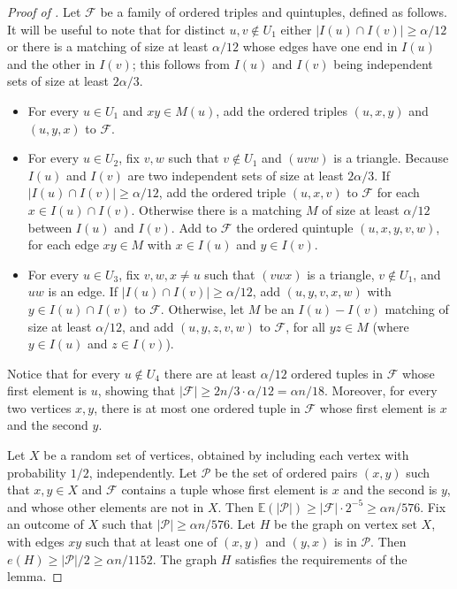 \documentclass[10pt,a4paper]{amsart}
\newcommand{\Ex}{\mathbb{E}}
\newcommand{\cF}{\mathcal{F}}
\newcommand{\cP}{\mathcal{P}}
\begin{document}
\begin{proof}[Proof of ]
			Let $\cF$ be a family of ordered triples and quintuples, defined as follows. 
			It will be useful to note that for distinct $u,v \notin U_1$ either $|I(u) \cap I(v)| \ge \alpha/12$ or there is a matching of size at least $\alpha/12$ whose edges have one end in $I(u)$ and the other in $I(v)$; this follows from $I(u)$ and $I(v)$ being independent sets of size at least $2\alpha/3$.
			\begin{itemize}
				\item
					For every $u \in U_1$ and $xy \in M(u)$, add the ordered triples $(u,x,y)$ and $(u, y, x)$ to $\cF$.
				\item
					For every $u \in U_2$, fix $v, w$ such that $v \notin U_1$ and $(uvw)$ is a triangle.
					Because $I(u)$ and $I(v)$ are two independent sets of size at least $2\alpha/3$.
					If $|I(u) \cap I(v)| \ge \alpha/12$, add the ordered triple $(u,x,v)$ to $\cF$ for each $x \in I(u) \cap I(v)$. 
					Otherwise there is a matching $M$ of size at least $\alpha/12$ between $I(u)$ and $I(v)$. Add to $\cF$ the ordered quintuple $(u, x, y, v, w)$, for each edge $xy \in M$ with $x \in I(u)$ and $y \in I(v)$.
				\item
					For every $u \in U_3$, fix $v, w, x \neq u$ such that $(v w x)$ is a triangle, $v \notin U_1$, and $uw$ is an edge. If $|I(u) \cap I(v)| \ge \alpha/12$, add $(u, y, v, x, w)$ with $y \in I(u) \cap I(v)$ to $\cF$. Otherwise, let $M$ be an $I(u)-I(v)$ matching of size at least $\alpha/12$, and add $(u, y, z, v, w)$ to $\cF$, for all $yz \in M$ (where $y \in I(u)$ and $z \in I(v)$). 
			\end{itemize}
			Notice that for every $u \notin U_4$ there are at least $\alpha/12$ ordered tuples in $\cF$ whose first element is $u$, showing that $|\cF| \ge 2n/3 \cdot \alpha/12 = \alpha n/18$. Moreover, for every two vertices $x,y$, there is at most one ordered tuple in $\cF$ whose first element is $x$ and the second $y$.

			Let $X$ be a random set of vertices, obtained by including each vertex with probability $1/2$, independently. 
			Let $\cP$ be the set of ordered pairs $(x,y)$ such that $x,y \in X$ and $\cF$ contains a tuple whose first element is $x$ and the second is $y$, and whose other elements are not in $X$.
			Then $\Ex(|\cP|) \ge |\cF| \cdot 2^{-5} \ge \alpha n / 576$. Fix an outcome of $X$ such that $|\cP| \ge \alpha n / 576$.
			Let $H$ be the graph on vertex set $X$, with edges $xy$ such that at least one of $(x,y)$ and $(y,x)$ is in $\cP$. Then $e(H) \ge |\cP|/2 \ge \alpha n / 1152$. The graph $H$ satisfies the requirements of the lemma.
		\end{proof}
\end{document}
